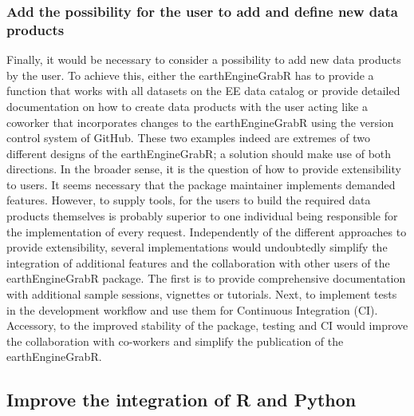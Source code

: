 \subsubsection{Add the possibility for the user to add and define new data products}

Finally, it would be necessary to consider a possibility to add new data products by the user. To achieve this, either the earthEngineGrabR has to provide a function that works with all datasets on the EE data catalog or provide detailed documentation on how to create data products with the user acting like a coworker that incorporates changes to the earthEngineGrabR using the version control system of GitHub. These two examples indeed are extremes of two different designs of the earthEngineGrabR; a solution should make use of both directions. In the broader sense, it is the question of how to provide extensibility to users. It seems necessary that the package maintainer implements demanded features. However, to supply tools, for the users to build the required data products themselves is probably superior to one individual being responsible for the implementation of every request.
Independently of the different approaches to provide extensibility, several implementations would undoubtedly simplify the integration of additional features and the collaboration with other users of the earthEngineGrabR package. The first is to provide comprehensive documentation with additional sample sessions, vignettes or tutorials. Next, to implement tests in the development workflow and use them for Continuous Integration (CI). Accessory, to the improved stability of the package, testing and CI would improve the collaboration with co-workers and simplify the publication of the earthEngineGrabR. 

\subsection{Improve the integration of R and Python}

